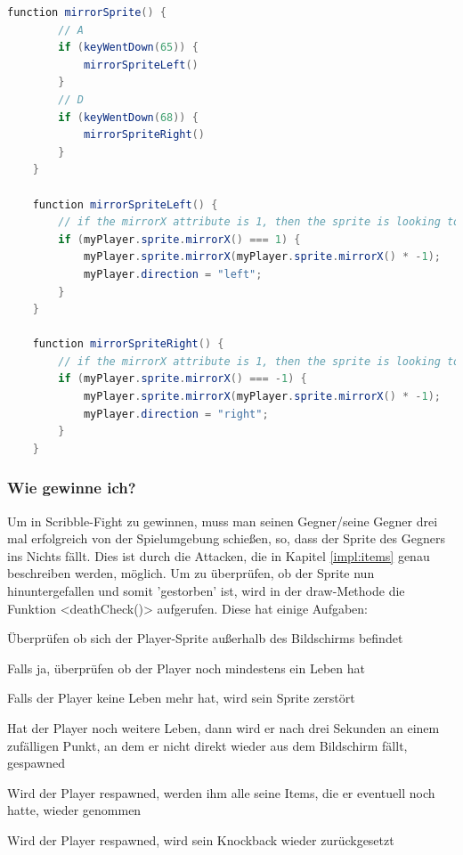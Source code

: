\begin{lstlisting}[caption=Sprite Richtungswechsel,language=Java,label=lst:impl:mirrorSprite]
    function mirrorSprite() {
        // A
        if (keyWentDown(65)) {
            mirrorSpriteLeft()
        }
        // D
        if (keyWentDown(68)) {
            mirrorSpriteRight()
        }
    }
    
    function mirrorSpriteLeft() {
        // if the mirrorX attribute is 1, then the sprite is looking to the right
        if (myPlayer.sprite.mirrorX() === 1) {
            myPlayer.sprite.mirrorX(myPlayer.sprite.mirrorX() * -1);
            myPlayer.direction = "left";
        }
    }
    
    function mirrorSpriteRight() {
        // if the mirrorX attribute is 1, then the sprite is looking to the left
        if (myPlayer.sprite.mirrorX() === -1) {
            myPlayer.sprite.mirrorX(myPlayer.sprite.mirrorX() * -1);
            myPlayer.direction = "right";
        }
    }
\end{lstlisting}

\subsubsection{Wie gewinne ich?}
Um in Scribble-Fight zu gewinnen, muss man seinen Gegner/seine Gegner drei mal erfolgreich von der Spielumgebung schießen, so, dass der Sprite des Gegners ins Nichts fällt.
Dies ist durch die Attacken, die in Kapitel \ref{impl:items} genau beschreiben werden, möglich. 
Um zu überprüfen, ob der Sprite nun hinuntergefallen und somit 'gestorben' ist, wird in der draw-Methode die Funktion <deathCheck()> aufgerufen.
Diese hat einige Aufgaben:
\begin{compactitem}
    \item Überprüfen ob sich der Player-Sprite außerhalb des Bildschirms befindet
    \item Falls ja, überprüfen ob der Player noch mindestens ein Leben hat
    \item Falls der Player keine Leben mehr hat, wird sein Sprite zerstört
    \item Hat der Player noch weitere Leben, dann wird er nach drei Sekunden an einem zufälligen Punkt, an dem er nicht direkt wieder aus dem Bildschirm fällt, gespawned
    \item Wird der Player respawned, werden ihm alle seine Items, die er eventuell noch hatte, wieder genommen
    \item Wird der Player respawned, wird sein Knockback wieder zurückgesetzt
\end{compactitem}

